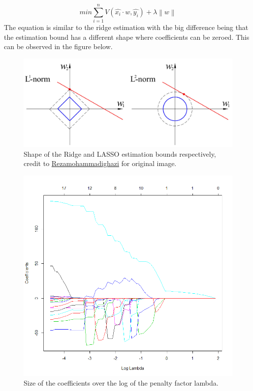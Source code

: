 \documentclass[a4paper,12pt]{article}
\begin{document}
\begin{equation}
  min \sum_{i = 1}^n{V(\hat{x_i}\cdot w,\hat{y_i}) + \lambda\left \| w \right \|}
\end{equation}
The equation is similar to the ridge estimation with the big difference being that the estimation bound has a different shape where coefficients can be zeroed. This can be observed in the figure below.

\begin{figure}[H]
\centering
\begin{minipage}[]{0.75\textwidth}
  \includegraphics[width=\textwidth]{figures/L1_and_L2_balls.jpg}  
  \caption{Shape of the Ridge and LASSO estimation bounds respectively, credit to \href{https://en.wikipedia.org/wiki/File:L1_and_L2_balls.jpg}{Rezamohammadighazi} for original image.}
 \end{minipage}
\end{figure}

\begin{figure}[H]
\centering
\begin{minipage}[]{0.75\textwidth}
  \includegraphics[width=\textwidth]{figures/Lab2A2_coef_lasso.png}  
  \caption{Size of the coefficients over the log of the penalty factor lambda.}
 \end{minipage}
\end{figure}
\end{document}

